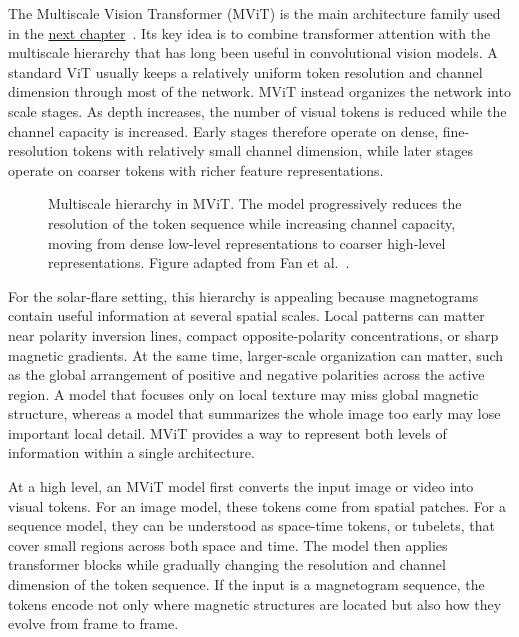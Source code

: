 The Multiscale Vision Transformer (MViT) is the main architecture family used in the \hyperref[chap:article1]{next chapter}~\cite{ref_mvit}. Its key idea is to combine transformer attention with the multiscale hierarchy that has long been useful in convolutional vision models. A standard ViT usually keeps a relatively uniform token resolution and channel dimension through most of the network. MViT instead organizes the network into scale stages. As depth increases, the number of visual tokens is reduced while the channel capacity is increased. Early stages therefore operate on dense, fine-resolution tokens with relatively small channel dimension, while later stages operate on coarser tokens with richer feature representations.

\begin{figure}[H]
\centering
{}
\caption{Multiscale hierarchy in MViT. The model progressively reduces the resolution of the token sequence while increasing channel capacity, moving from dense low-level representations to coarser high-level representations. Figure adapted from Fan et al.~\cite{ref_mvit}.}
\label{fig:intro_mvit_teaser}
\end{figure}

For the solar-flare setting, this hierarchy is appealing because magnetograms contain useful information at several spatial scales. Local patterns can matter near polarity inversion lines, compact opposite-polarity concentrations, or sharp magnetic gradients. At the same time, larger-scale organization can matter, such as the global arrangement of positive and negative polarities across the active region. A model that focuses only on local texture may miss global magnetic structure, whereas a model that summarizes the whole image too early may lose important local detail. MViT provides a way to represent both levels of information within a single architecture.

At a high level, an MViT model first converts the input image or video into visual tokens. For an image model, these tokens come from spatial patches. For a sequence model, they can be understood as space-time tokens, or tubelets, that cover small regions across both space and time. The model then applies transformer blocks while gradually changing the resolution and channel dimension of the token sequence. If the input is a magnetogram sequence, the tokens encode not only where magnetic structures are located but also how they evolve from frame to frame.

